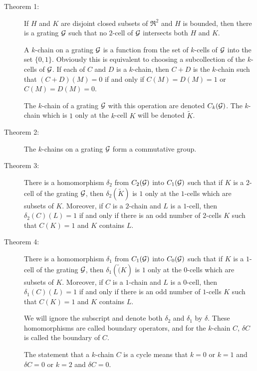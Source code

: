 \documentclass{article}
\begin{document}
\begin{description}

  \item[Theorem 1:] If $H$ and $K$ are disjoint closed subsets of $\Re^2$ and $H$ is bounded, then there is a grating ${\cal G}$ such that no $2$-cell of ${\cal G}$ intersects both $H$ and $K$.

  \item[] A $k$-chain on a grating ${\cal G}$ is a function from the set of $k$-cells of ${\cal G}$ into the set $\{ 0,1 \}$. Obviously this is equivalent to choosing a subcollection of the $k$-cells of ${\cal G}$. If each of $C$ and $D$ is a $k$-chain, then $C+D$ is the $k$-chain such that $(C+D)(M) = 0$ if and only if $C(M) = D(M) = 1$ or $C(M) = D(M) = 0$.

  \item[] The $k$-chain of a grating ${\cal G}$ with this operation are denoted $C_k ({\cal G})$. The $k$-chain which is $1$ only at the $k$-cell $K$ will be denoted $\tilde{K}$.

  \item[Theorem 2:] The $k$-chains on a grating ${\cal G}$ form a commutative group.

  \item[Theorem 3:] There is a homomorphism $\delta_2$ from $C_2({\cal G})$ into $C_1({\cal G})$ such that if $K$ is a $2$-cell of the grating ${\cal G}$, then $\delta_2(\tilde{K})$ is $1$ only at the $1$-cells which are subsets of $K$. Moreover, if $C$ is a $2$-chain and $L$ is a $1$-cell, then $\delta_2(C)(L) = 1$ if and only if there is an odd number of $2$-cells $K$ such that $C(K)=1$ and $K$ contains $L$.

  \item[Theorem 4:] There is a homomorphism $\delta_1$ from $C_1({\cal G})$ into $C_0({\cal G})$ such that if $K$ is a $1$-cell of the grating ${\cal G}$, then $\delta_1(\tilde(K)$ is $1$ only at the $0$-cells which are subsets of $K$. Moreover, if $C$ is a $1$-chain and $L$ is a $0$-cell, then $\delta_1(C)(L)=1$ if and only if there is an odd number of $1$-cells $K$ such that $C(K)=1$ and $K$ contains $L$.

  \item[] We will ignore the subscript and denote both $\delta_2$ and $\delta_1$ by $\delta$. These homomorphisms are called boundary operators, and for the $k$-chain $C$, $\delta C$ is called the boundary of $C$.

  \item[] The statement that a $k$-chain $C$ is a cycle means that $k=0$ or $k=1$ and $\delta C = 0$ or $k=2$ and $\delta C = 0$.


\end{description}
\end{document}
